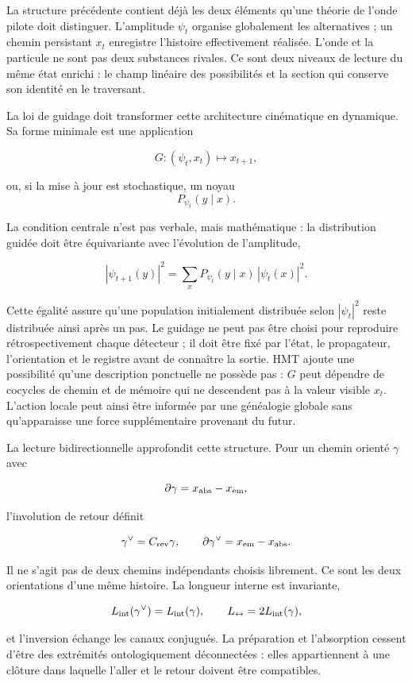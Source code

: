 La structure précédente contient déjà les deux éléments qu'une théorie de l'onde pilote
doit distinguer. L'amplitude \(\psi_t\) organise globalement les alternatives ;
un chemin persistant \(x_t\) enregistre l'histoire effectivement réalisée. L'onde
et la particule ne sont pas deux substances rivales. Ce sont deux niveaux de lecture du même
état enrichi : le champ linéaire des possibilités et la section qui conserve son
identité en le traversant.

La loi de guidage doit transformer cette architecture cinématique en dynamique. Sa forme
minimale est une application

\[
  G:(\psi_t,x_t)\longmapsto x_{t+1},
\]

ou, si la mise à jour est stochastique, un noyau
\[
  P_{\psi_t}(y\mid x).
\]

La condition centrale n'est pas verbale, mais mathématique : la distribution guidée doit être
équivariante avec l'évolution de l'amplitude,

\[
  |\psi_{t+1}(y)|^2
  =
  \sum_x P_{\psi_t}(y\mid x)\,|\psi_t(x)|^2.
\]

Cette égalité assure qu'une population initialement distribuée selon
\(|\psi_t|^2\) reste distribuée ainsi après un pas. Le guidage ne peut pas
être choisi pour reproduire rétrospectivement chaque détecteur ; il doit être fixé par
l'état, le propagateur, l'orientation et le registre avant de connaître la sortie.
HMT ajoute une possibilité qu'une description ponctuelle ne possède pas : \(G\) peut
dépendre de cocycles de chemin et de mémoire qui ne descendent pas à la valeur visible
\(x_t\). L'action locale peut ainsi être informée par une généalogie globale sans
qu'apparaisse une force supplémentaire provenant du futur.

La lecture bidirectionnelle approfondit cette structure. Pour un chemin orienté
\(\gamma\) avec

\[
  \partial\gamma=x_{\rm abs}-x_{\rm em},
\]

l'involution de retour définit

\[
  \gamma^\vee=C_{\rm rev}\gamma,
  \qquad
  \partial\gamma^\vee=x_{\rm em}-x_{\rm abs}.
\]

Il ne s'agit pas de deux chemins indépendants choisis librement. Ce sont les deux
orientations d'une même histoire. La longueur interne est invariante,

\[
  L_{\rm int}(\gamma^\vee)=L_{\rm int}(\gamma),
  \qquad
  L_{\leftrightarrow}=2L_{\rm int}(\gamma),
\]

et l'inversion échange les canaux conjugués. La préparation et l'absorption
cessent d'être des extrémités ontologiquement déconnectées : elles appartiennent à une clôture dans
laquelle l'aller et le retour doivent être compatibles.

